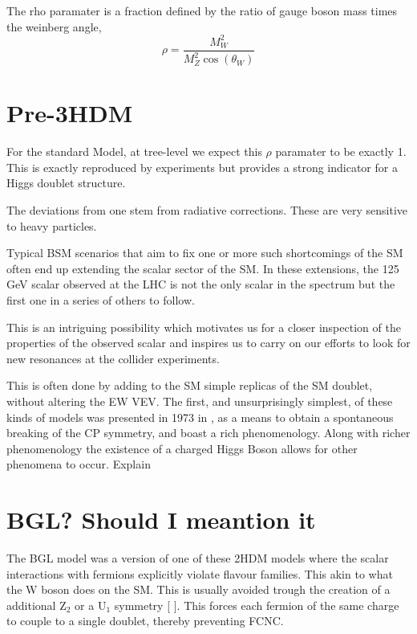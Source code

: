 The rho paramater is a fraction defined by the ratio of gauge boson mass times the weinberg angle, 
\begin{equation}
\rho = \frac{M_W^2}{M^2_Z \cos(\theta_W)}
\end{equation}
\section{Pre-3HDM}
For the standard Model, at tree-level we expect this $\rho$ paramater to be exactly 1. This is exactly reproduced by experiments but provides a strong indicator for a Higgs doublet structure. 

The deviations from one stem from radiative corrections. These are very sensitive to heavy particles. 



Typical BSM scenarios that aim to fix one or more such shortcomings of the SM often end up extending the scalar
sector of the SM. In these extensions, the 125 GeV scalar observed at the LHC is not the only scalar in the spectrum but the first one in a series of others to follow.

This is an intriguing possibility which motivates us
for a closer inspection of the properties of the observed scalar and inspires us to carry on our efforts to look for
new resonances at the collider experiments.

This is often done by adding to the SM simple replicas of the SM doublet, without altering the EW VEV. The first, and unsurprisingly simplest, of these kinds of models was presented in 1973 in \cite{lee1973theory}, as a means to obtain a spontaneous breaking of the CP symmetry, and boast a rich phenomenology. Along with richer phenomenology the existence of a charged Higgs Boson allows for other phenomena to occur. {\color{red} Explain} 

\section{BGL? Should I meantion it}

The BGL model was a version of one of these 2HDM models where the scalar interactions with fermions explicitly violate flavour families. This akin to what the W boson does on the SM. This is usually avoided trough the creation of a additional $\mathrm{Z}_2$  or a $\mathrm{U}_1$ symmetry [
]. This forces each fermion of the same charge to couple to a single doublet, thereby preventing FCNC.

